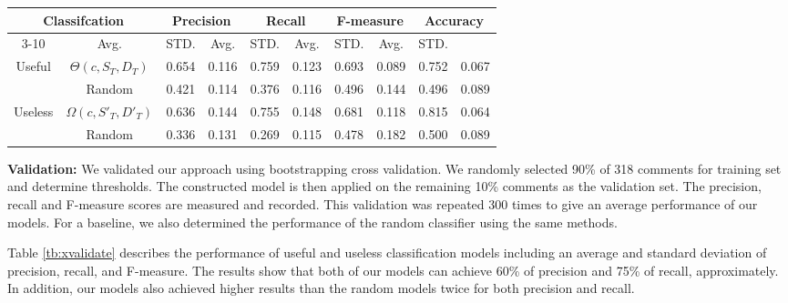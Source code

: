 \begin{table*}[!t]
\caption{Results from bootstrapping cross validation of our classification models against random models}
\small
\centering
\def\arraystretch{1.2}
\begin{tabular}{cccc|cc|cc|cc}
\hline
\multicolumn{2}{c}{Classifcation}   & \multicolumn{2}{c|}{Precision} & \multicolumn{2}{c|}{Recall} & \multicolumn{2}{c|}{F-measure} & \multicolumn{2}{c}{Accuracy} \\ \cline{3-10}
\multicolumn{2}{c}{Models} & Avg. & STD. & Avg. & STD. & Avg. & STD. & Avg. & STD. \\ \hline \hline
\multirow{2}{*}{Useful} & $\Theta(c,S_T,D_T)$    &  0.654 & 0.116 &  0.759 & 0.123 & 0.693 & 0.089 & 0.752 & 0.067 \\ \cline{2-10}
& Random     &  0.421 & 0.114 &  0.376 & 0.116 & 0.496 & 0.144 & 0.496 & 0.089 \\ \hline
\multirow{2}{*}{Useless}  & $\Omega(c,S'_T,D'_T)$  &  0.636 & 0.144 &  0.755 & 0.148 & 0.681 & 0.118 & 0.815 & 0.064 \\ \cline{2-10}
& Random    &  0.336 & 0.131 &  0.269 & 0.115 & 0.478 & 0.182 & 0.500 & 0.089 \\
\hline
\end{tabular}
\label{tb:xvalidate}
\end{table*}


\textbf{Validation:}
We validated our approach using bootstrapping cross validation.
We randomly selected 90\% of 318 comments for training set and determine thresholds.
The constructed model is then applied on the remaining 10\% comments as the validation set.
The precision, recall and F-measure scores are measured and recorded.
This validation was repeated 300 times to give an average performance of our models.
For a baseline, we also determined the performance of the random classifier using the same methods.

Table \ref{tb:xvalidate} describes the performance of useful and useless classification models including an average and standard deviation of precision, recall, and F-measure.
The results show that both of our models can achieve 60\% of precision and 75\% of recall, approximately.
In addition, our models also achieved higher results than the random models twice for both precision and recall.






